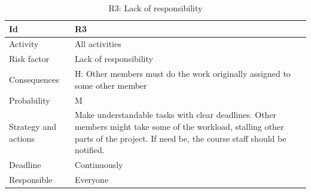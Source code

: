 \documentclass[11pt]{book}
\begin{document}
\begin{table}[H]
\centering
\begin{tabular}{ l  p{11cm} }
    Id                      & R3                                                                          \\ \hline
    Activity                & All activities                                                              \\ \hline
    Risk factor             & Lack of responsibility                                                      \\ \hline
    Consequences            & H: Other members must do the work originally assigned to some other member  \\ \hline
    Probability             & M                                                                           \\ \hline
    Strategy and actions    & Make understandable tasks with clear deadlines. Other members might take 
                                some of the workload, stalling other parts of the project. If need be, 
                                the course staff should be notified.                                      \\ \hline
    Deadline                & Continuously                                                                \\ \hline
    Responsible             & Everyone                                                                    \\ 
\end{tabular}
\caption{R3: Lack of responsibility}
\label{tab:risk_3}
\end{table}
\end{document}
